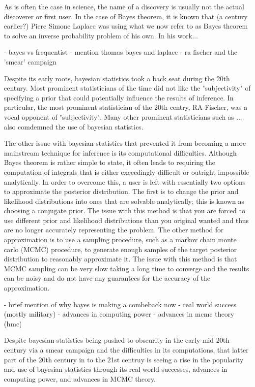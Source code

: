 As is often the case in science, the name of a discovery is usually not the actual discoverer or first user. In the case of Bayes theorem, it is known that (a century earlier?) Piere Simone Laplace was using what we now refer to as Bayes theorem to solve an inverse probability problem of his own. In his work...


- bayes vs frequentist
	- mention thomas bayes and laplace
	- ra fischer and the 'smear' campaign
	
Despite its early roots, bayesian statistics took a back seat during the 20th century. Most prominent statisticians of the time did not like the "subjectivity" of specifying a prior that could potentially influence the results of inference. In particular, the most prominent statistician of the 20th centry, RA Fischer, was a vocal opponent of "subjectivity". Many other prominent statisticians such as ... also comdemned the use of bayesian statistics.

The other issue with bayesian statistics that prevented it from becoming a more mainstream technique for inference is its computational difficulties. Although Bayes theorem is rather simple to state, it often leads to requiring the computation of integrals that is either exceedingly difficult or outright impossible analytically. In order to overcome this, a user is left with essentially two options to approximate the posterior distribution. The first is to change the prior and likelihood distributions into ones that are solvable analytically; this is known as choosing a conjugate prior. The issue with this method is that you are forced to use different prior and likelihood distributions than you original wanted and thus are no longer accurately representing the problem. The other method for approximation is to use a sampling procedure, such as a markov chain monte carlo (MCMC) procedure, to generate enough samples of the target posterior distribution to reasonably approximate it. The issue with this method is that MCMC sampling can be very slow taking a long time to converge and the results can be noisy and do not have any guarantees for the accuracy of the approximation.
	
- brief mention of why bayes is making a combeback now
	- real world success (mostly military)
	- advances in computing power
	- advances in mcmc theory (hmc)

Despite bayesian statistics being pushed to obscurity in the early-mid 20th century via a smear campaign and the difficulties in its computations, that latter part of the 20th century in to the 21st centruy is seeing a rise in the popularity and use of bayesian statistics through its real world successes, advances in computing power, and advances in MCMC theory.

